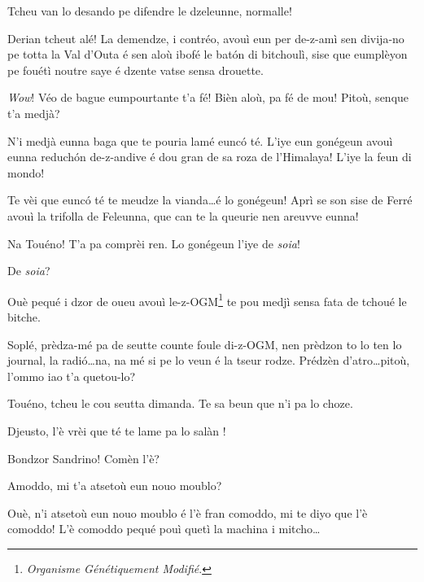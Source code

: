 \begin{drama}
\Tuenospeaks{} Tcheu van lo desando pe difendre le dzeleunne, normalle!

\Gerominespeaks Derian tcheut alé! La demendze, i contréo, avouì eun per de-z-amì sen divija-no pe totta la Val d'Outa é sen aloù ibofé le bat\'on di bitchoulì, sise que eumplèyon pe fouétì noutre saye é dzente vatse sensa drouette.

\Tuenospeaks {} \textit{Wow}! Véo de bague eumpourtante t'a fé! Bièn aloù, pa fé de mou! Pitoù, senque t'a medjà? 

\Gerominespeaks N'i medjà eunna baga que te pouria lamé eunc\'o té. L'iye eun gonégeun avouì eunna reduch\'on de-z-andive é dou gran de sa roza de l'Himalaya! L'iye la feun di mondo!

\Tuenospeaks Te vèi que eunc\'o té te meudze la vianda\ldots é lo gonégeun! Aprì se son sise de Ferré avouì la trifolla de Feleunna, que can te la queurie nen areuvve eunna!

\Gerominespeaks Na Touéno! T'a pa comprèi ren. Lo gonégeun l'iye de \textit{soia}!

\Tuenospeaks De \textit{soia}?

\Gerominespeaks Ouè pequé i dzor de oueu avouì le-z-OGM\footnote{ \textit{Organisme Génétiquement Modifié}.} te pou medjì sensa fata de tchoué le bitche.

\Tuenospeaks{} Soplé, prèdza-mé pa de seutte counte foule di-z-OGM, nen prèdzon to lo ten lo journal, la radi\'o\ldots na, na mé si pe lo veun é la tseur rodze. Prédzèn d'atro\ldots pitoù, l’ommo iao t'a quetou-lo?

\Gerominespeaks{} Touéno, tcheu le cou seutta dimanda. Te sa beun que n'i pa lo choze.

\Tuenospeaks Djeusto, l'è vrèi que té te lame pa lo salàn \salan ! 





\Richardspeaks Bondzor Sandrino! Comèn l'è?

\Sandrinospeaks Amoddo, mi t'a atsetoù eun nouo moublo?

\Richardspeaks Ouè, n'i atsetoù eun nouo moublo é l'è fran comoddo,  mi te diyo que l'è comoddo! L'è comoddo pequé pouì quetì la machina i mitcho\ldots


\end{drama}
